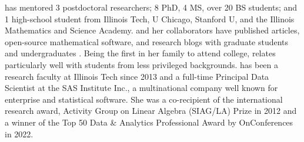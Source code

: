 has mentored 3 postdoctoral researchers; 8 PhD, 4 MS, over 20 BS students; and 1 high-school student from Illinois Tech, U Chicago, Stanford U, and the Illinois Mathematics and Science Academy. \SCTC and her collaborators have published articles, open-source mathematical software, and research blogs with graduate students \cite{ChoEtal22a,QMCPy2020a,QMCBlog,
ChoEtal20a,WCCR18,ChoEtal17a} and undergraduates \cite{QMCPy2020a,QMCBlog,PCLD21,ZLWC21}. Being the first in her family to attend college, \SCTC relates particularly well with students from less privileged backgrounds. \SCTC has been a research faculty  at  Illinois Tech since 2013 and a full-time Principal Data Scientist at the SAS Institute Inc., a multinational company well known for enterprise and statistical software.  She was a co-recipient of the international research award, \SIAM Activity Group on Linear Algebra (SIAG/LA) Prize in 2012 and  a winner of the Top 50 Data \& Analytics Professional Award by OnConferences in 2022. 

